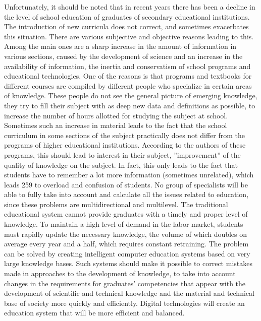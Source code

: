 \documentclass[a4paper, 10pt,twocolumn]{article}
\begin{document}
Unfortunately, it should be noted that in recent years
there has been a decline in the level of school education of graduates of secondary educational institutions.
The introduction of new curricula does not correct, and
sometimes exacerbates this situation. There are various
subjective and objective reasons leading to this. Among
the main ones are a sharp increase in the amount of
information in various sections, caused by the development of science and an increase in the availability of
information, the inertia and conservatism of school programs and educational technologies. One of the reasons
is that programs and textbooks for different courses are
compiled by different people who specialize in certain
areas of knowledge. These people do not see the general
picture of emerging knowledge, they try to fill their
subject with as deep new data and definitions as possible,
to increase the number of hours allotted for studying
the subject at school. Sometimes such an increase in
material leads to the fact that the school curriculum in
some sections of the subject practically does not differ
from the programs of higher educational institutions.
According to the authors of these programs, this should
lead to interest in their subject, ”improvement” of the
quality of knowledge on the subject. In fact, this only
leads to the fact that students have to remember a lot
more information (sometimes unrelated), which leads
259
to overload and confusion of students. No group of
specialists will be able to fully take into account and
calculate all the issues related to education, since these
problems are multidirectional and multilevel. The traditional educational system cannot provide graduates with
a timely and proper level of knowledge. To maintain a
high level of demand in the labor market, students must
rapidly update the necessary knowledge, the volume of
which doubles on average every year and a half, which
requires constant retraining. The problem can be solved
by creating intelligent computer education systems based
on very large knowledge bases. Such systems should
make it possible to correct mistakes made in approaches
to the development of knowledge, to take into account
changes in the requirements for graduates’ competencies
that appear with the development of scientific and technical knowledge and the material and technical base of
society more quickly and efficiently. Digital technologies
will create an education system that will be more efficient
and balanced.
\end{document}
